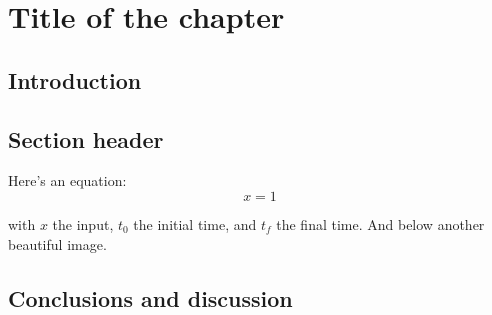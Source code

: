 \chapter{Title of the chapter}\label{chap: chapter 1}



\chapterabstract{\lipsum[1]}

\section{Introduction} \label{sec: chap2 intro}

\lipsum[5-7]

\section{Section header}\label{sec: chap2 section header}

Here's an equation:
\begin{equation}\label{eq: chap2 vector field} 
x = 1
\end{equation}

with $x$ the input, $t_0$ the initial time, and $t_f$ the final time. 
And below another beautiful image.



\section{Conclusions and discussion}
\label{sec: chap2 conclusion}

\lipsum[10-13]


